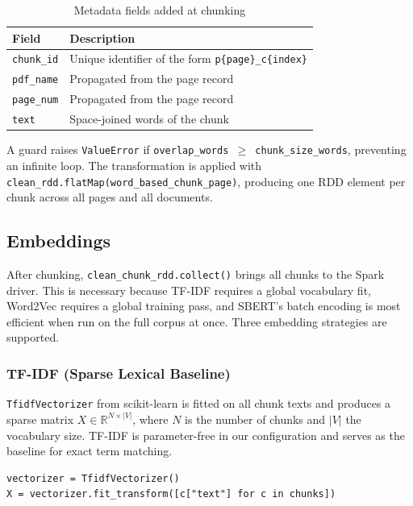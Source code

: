 \documentclass[a4paper,11pt]{article}
\begin{document}
\begin{table}[H]
  \centering
  \caption{Metadata fields added at chunking}
  \begin{tabularx}{\linewidth}{lX}
    \toprule
    \textbf{Field} & \textbf{Description} \\
    \midrule
    \texttt{chunk\_id}  & Unique identifier of the form \texttt{p\{page\}\_c\{index\}} \\
    \texttt{pdf\_name}  & Propagated from the page record \\
    \texttt{page\_num}  & Propagated from the page record \\
    \texttt{text}       & Space-joined words of the chunk \\
    \bottomrule
  \end{tabularx}
\end{table}

A guard raises \texttt{ValueError} if \texttt{overlap\_words $\geq$ chunk\_size\_words},
preventing an infinite loop. The transformation is applied with
\texttt{clean\_rdd.flatMap(word\_based\_chunk\_page)}, producing one RDD
element per chunk across all pages and all documents.

\subsection{Embeddings}

After chunking, \texttt{clean\_chunk\_rdd.collect()} brings all chunks to the
Spark driver. This is necessary because TF-IDF requires a global vocabulary
fit, Word2Vec requires a global training pass, and SBERT's batch encoding is
most efficient when run on the full corpus at once. Three embedding strategies
are supported.

\subsubsection{TF-IDF (Sparse Lexical Baseline)}

\texttt{TfidfVectorizer} from scikit-learn is fitted on all chunk texts and
produces a sparse matrix $X \in \mathbb{R}^{N \times |V|}$, where $N$ is the
number of chunks and $|V|$ the vocabulary size. TF-IDF is parameter-free in
our configuration and serves as the baseline for exact term matching.

\begin{lstlisting}
vectorizer = TfidfVectorizer()
X = vectorizer.fit_transform([c["text"] for c in chunks])
\end{lstlisting}
\end{document}
